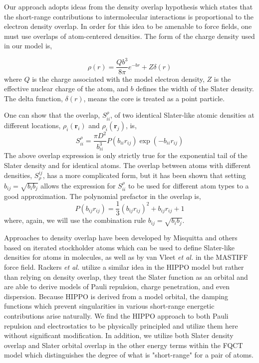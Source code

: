 \documentclass[journal=jctcce,manuscript=article]{achemso}
\begin{document}
Our approach adopts ideas from the density overlap hypothesis\cite{kim1981dependence,wheatley1990overlap,gavezzotti2002calculation,van2016beyond,van2018new}
which states that the short-range contributions to intermolecular interactions is proportional to the electron density overlap. In order for this idea to be amenable to force fields, one must use overlaps of atom-centered
densities. The form of the charge density used in our model is,

\begin{equation}
  \rho(r)=\frac{Qb^3}{8\pi}e^{-br}+Z\delta(r)
  \label{eq:slater}
\end{equation}
\noindent
where $Q$ is the charge associated with the model electron density, $Z$ is the effective nuclear charge of the atom, and $b$ defines the width of the Slater density. The delta function, $\delta(r)$, means the core is treated as a point particle. 

One can show that the overlap, $S_{ii}^\rho$, of two identical Slater-like atomic densities at different locations, $\rho_i(\bm{r}_i)$ and $\rho_i(\bm{r}_j)$, is,
\begin{equation}
  S_{ii}^\rho=\frac{\pi D^2}{b_{ii}^3}P(b_{ii}r_{ij})\exp(-b_{ii}r_{ij})
\end{equation}
The above overlap expression is only strictly true for the exponential tail of the Slater density and for identical atoms. The overlap between atoms with different densities, $S^{ij}_\rho$, has a more complicated form, but it has been shown that setting $b_{ij}=\sqrt{b_ib_j}$ allows the expression
for $S_{ii}^\rho$ to be used for different atom types to a good
approximation\cite{van2016beyond}. The polynomial prefactor in the overlap is,
\begin{equation}
  P(b_{ij}r_{ij})=\frac13(b_{ij}r_{ij})^2 + b_{ij}r_{ij}+1
\end{equation}
where, again, we will use the combination rule $b_{ij}=\sqrt{b_ib_j}$. 

Approaches to density overlap have been developed by Misquitta and others\cite{misquitta2014distributed,misquitta2018isa} based on iterated stockholder atoms which can be used to define Slater-like densities for atoms in molecules, as well as by van Vleet \textit{et al.} in the MASTIFF force field.\cite{van2016beyond,van2018new} Rackers \textit{et al.} utilize a similar idea in the HIPPO model\cite{rackers2021polarizable}
but rather than relying on density overlap, they treat the Slater function as an orbital and are able to derive models of Pauli repulsion, charge penetration, and even dispersion. Because HIPPO is derived from a model orbital, the damping functions which prevent singularities in various short-range energetic contributions arise naturally. We find the HIPPO approach to both Pauli repulsion and electrostatics to be physically principled and utilize them here without significant modification. In addition, we utilize both Slater density overlap and Slater orbital overlap in the other energy terms within the FQCT model which distinguishes the degree of what is "short-range" for a pair of atoms. 
\end{document}
